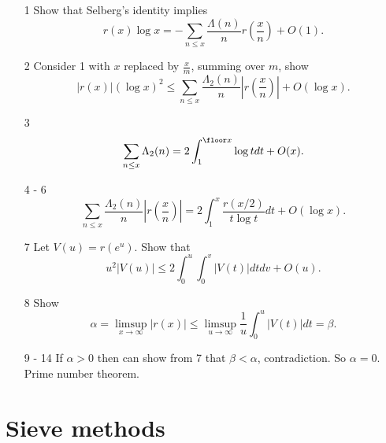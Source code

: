 \documentclass[a4paper]{article}
\begin{document}
\begin{enumerate}
\item[1] Show that Selberg's identity implies
  \[
    r(x) \log x = - \sum_{n \leq x} \frac{\Lambda(n)}{n} r (\frac{x}{n}) + O(1).
  \]
\item[2] Consider 1 with \(x\) replaced by \(\frac{x}{m}\), summing over \(m\), show
  \[
    |r(x)| (\log x)^2 \leq \sum_{n \leq x} \frac{\Lambda_2(n)}{n} \left|r(\frac{x}{n})\right| + O(\log x).
  \]
\item[3]
  \[
    \sum_{n \leq x} \Lambda_2(n) = 2 \int_1^{\floor x} \log t dt + O(x).
  \]
\item[4 - 6]
  \[
    \sum_{n \leq x} \frac{\Lambda_2(n)}{n} |r(\frac{x}{n})|
    = 2 \int_1^x \frac{r(x/2)}{t \log t} dt + O(\log x).
  \]
\item[7] Let \(V(u) = r(e^u)\). Show that
  \[
    u^2 |V(u)| \leq 2 \int_0^u \int_0^v |V(t)| dt dv + O(u).
  \]
\item[8] Show
  \[
    \alpha = \limsup_{x \to \infty} |r(x)| \leq \limsup_{u \to \infty} \frac{1}{u} \int_0^u |V(t)| dt = \beta.
  \]
\item[9 - 14] If \(\alpha > 0\) then can show from 7 that \(\beta < \alpha\), contradiction. So \(\alpha = 0\). Prime number theorem.
\end{enumerate}

\section{Sieve methods}
\end{document}
